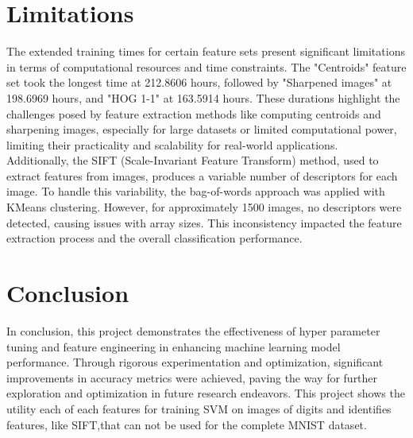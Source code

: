 \documentclass{article}
\begin{document}
\section{Limitations}
The extended training times for certain feature sets present significant limitations in terms of computational resources and time constraints. The "Centroids" feature set took the longest time at 212.8606 hours, followed by "Sharpened images" at 198.6969 hours, and "HOG 1-1" at 163.5914 hours. These durations highlight the challenges posed by feature extraction methods like computing centroids and sharpening images, especially for large datasets or limited computational power, limiting their practicality and scalability for real-world applications.
\\
Additionally, the SIFT (Scale-Invariant Feature Transform) method, used to extract features from images, produces a variable number of descriptors for each image. To handle this variability, the bag-of-words approach was applied with KMeans clustering. However, for approximately 1500 images, no descriptors were detected, causing issues with array sizes. This inconsistency impacted the feature extraction process and the overall classification performance.

\section{Conclusion}
In conclusion, this project demonstrates the effectiveness of hyper parameter tuning and feature engineering in enhancing machine learning model performance. Through rigorous experimentation and optimization, significant improvements in accuracy metrics were achieved, paving the way for further exploration and optimization in future research endeavors. This project shows the utility each of each features for training SVM on images of digits and identifies features, like SIFT,that can not be used for the complete MNIST dataset.
\end{document}
